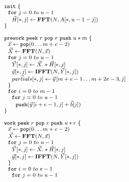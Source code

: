 \begin{equation} \nonumber 
\small{
\begin{array}{ll}
\vspace{-24pt}
    \\
    ~~~~{\tt init}~{\tt \{} \\
    ~~~~~~{\tt for}~j=0~to~u-1\\
    ~~~~~~~~\vec{H}[*,j] \leftarrow \mathbf{FFT}(N,A[*,u-1-j]) \\
    ~~~~{\tt \}} \\
    \\
    ~~~~{\tt prework}~{\tt peek}~r~{\tt pop}~r~{\tt push}~u*m~{\tt \{}\\
    ~~~~~~\vec{x} \leftarrow {\tt pop}(0 \dots m+e-2) \\
    ~~~~~~\vec{X} \leftarrow \mathbf{FFT} (N, \vec{x}) \\
    ~~~~~~{\tt for}~j=0~to~u-1\\
    ~~~~~~~~\vec{Y}[*,j] \leftarrow \vec{X} .* \vec{H}[*,j] \\
    ~~~~~~~~\vec{y}[*,j] \leftarrow \mathbf{IFFT}(N, \vec{Y}[*,j]) \\
    ~~~~~~~~\vec{partials}[*,j] \leftarrow \vec{y}\hspace{1pt}[m+e-1 \dots m+2e-3,j] \\
    ~~~~~~{\tt \}} \\
    ~~~~~~{\tt for}~i=0~to~m-1\\
    ~~~~~~~~{\tt for}~j=0~to~u-1\\
    ~~~~~~~~~~{\tt push}(\vec{y}\hspace{1pt}[i+e-1,j] + \vec{b}[j]) \\
    ~~~~{\tt \}} \\
    \\
    ~~~~{\tt work}~{\tt peek}~r~{\tt pop}~r~{\tt push}~u*r~{\tt \{} \\
    ~~~~~~\vec{x} \leftarrow {\tt pop}(0 \dots m+e-2) \\
    ~~~~~~\vec{X} \leftarrow \mathbf{FFT} (N, \vec{x}) \\
    ~~~~~~{\tt for}~j=0~to~u-1\\
    ~~~~~~~~\vec{Y}[*,j] \leftarrow \vec{X} .* \vec{H}[*,j] \\
    ~~~~~~~~\vec{y}[*,j] \leftarrow \mathbf{IFFT}(N, \vec{Y}[*,j]) \\
    ~~~~~~{\tt \}} \\
    ~~~~~~{\tt for}~i=0~to~e-1\\
    ~~~~~~~~{\tt for}~j=0~to~u-1\\

\end{array}}
\end{equation}
